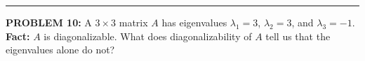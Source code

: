 \documentclass[12pt]{amsart}
\newcommand{\divider}{
  \vspace{-1em} %
  \noindent
  \raisebox{-0.15ex}{\textbullet}%
  \hspace{0.5em}%
  \rule[0.5ex]{0.95\textwidth}{1.0pt}%
  \hspace{0.5em}%
  \raisebox{-0.15ex}{\textbullet}%
  \vspace{0em} %
}
\begin{document}
%
%
%
%
%
%
%

\divider


{\bf PROBLEM 10:}
%
A $3 \times 3$ matrix $A$ has eigenvalues $\lambda_1 = 3$, $\lambda_2 = 3$, and $\lambda_3 = -1$. 
{\bf Fact:} $A$ is diagonalizable.
What does diagonalizability of $A$ tell us that the eigenvalues alone do not?
\end{document}
